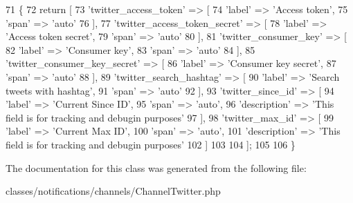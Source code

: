 \begin{DoxyCode}
71     \{
72         \textcolor{keywordflow}{return} [
73             \textcolor{stringliteral}{'twitter\_access\_token'} => [
74                 \textcolor{stringliteral}{'label'} => \textcolor{stringliteral}{'Access token'},
75                 \textcolor{stringliteral}{'span'}  => \textcolor{stringliteral}{'auto'}
76             ],
77             \textcolor{stringliteral}{'twitter\_access\_token\_secret'} => [
78                 \textcolor{stringliteral}{'label'} => \textcolor{stringliteral}{'Access token secret'},
79                 \textcolor{stringliteral}{'span'}  => \textcolor{stringliteral}{'auto'}
80             ],
81             \textcolor{stringliteral}{'twitter\_consumer\_key'} => [
82                 \textcolor{stringliteral}{'label'} => \textcolor{stringliteral}{'Consumer key'},
83                 \textcolor{stringliteral}{'span'}  => \textcolor{stringliteral}{'auto'}
84             ],
85             \textcolor{stringliteral}{'twitter\_consumer\_key\_secret'} => [
86                 \textcolor{stringliteral}{'label'} => \textcolor{stringliteral}{'Consumer key secret'},
87                 \textcolor{stringliteral}{'span'}  => \textcolor{stringliteral}{'auto'}
88             ],
89             \textcolor{stringliteral}{'twitter\_search\_hashtag'} => [
90                 \textcolor{stringliteral}{'label'} => \textcolor{stringliteral}{'Search tweets with hashtag'},
91                 \textcolor{stringliteral}{'span'}  => \textcolor{stringliteral}{'auto'}
92             ],
93             \textcolor{stringliteral}{'twitter\_since\_id'} => [
94                 \textcolor{stringliteral}{'label'} => \textcolor{stringliteral}{'Current Since ID'},
95                 \textcolor{stringliteral}{'span'}  => \textcolor{stringliteral}{'auto'},
96                 \textcolor{stringliteral}{'description'} => \textcolor{stringliteral}{'This field is for tracking and debugin purposes'}
97             ],
98             \textcolor{stringliteral}{'twitter\_max\_id'} => [
99                 \textcolor{stringliteral}{'label'} => \textcolor{stringliteral}{'Current Max ID'},
100                 \textcolor{stringliteral}{'span'}  => \textcolor{stringliteral}{'auto'},
101                 \textcolor{stringliteral}{'description'} => \textcolor{stringliteral}{'This field is for tracking and debugin purposes'}
102             ]
103 
104         ];
105 
106     \}
\end{DoxyCode}


The documentation for this class was generated from the following file\+:\begin{DoxyCompactItemize}
\item 
classes/notifications/channels/Channel\+Twitter.\+php\end{DoxyCompactItemize}
